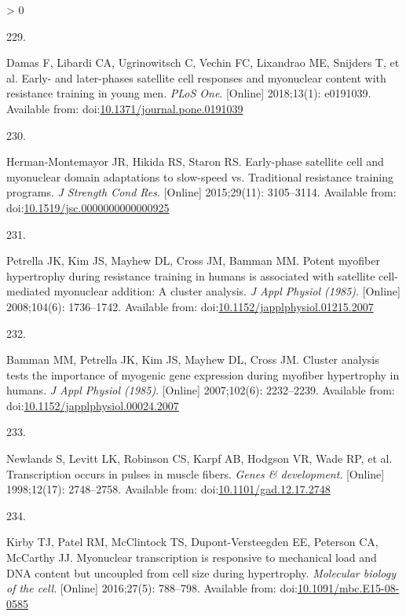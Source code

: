 \documentclass[twoside,10pt]{gihclass} %
\newlength{\cslhangindent}
\newlength{\csllabelwidth}
\newenvironment{CSLReferences}[3] %
 {%
  \setlength{\parindent}{0pt}
  \ifodd #1 \everypar{\setlength{\hangindent}{\cslhangindent}}\ignorespaces\fi
  \ifnum #2 > 0
  \setlength{\parskip}{#2\baselineskip}
  \fi
 }%
 {}
\newcommand{\CSLLeftMargin}[1]{\parbox[t]{\maxof{\widthof{#1}}{\csllabelwidth}}{#1}}
\newcommand{\CSLRightInline}[1]{\parbox[t]{\linewidth}{#1}}
\begin{document}
\begin{CSLReferences}{0}{0}
\leavevmode\hypertarget{ref-RN2112}{}%
\CSLLeftMargin{229. }
\CSLRightInline{Damas F, Libardi CA, Ugrinowitsch C, Vechin FC, Lixandrao ME, Snijders T, et al. Early- and later-phases satellite cell responses and myonuclear content with resistance training in young men. \emph{PLoS One}. {[}Online{]} 2018;13(1): e0191039. Available from: doi:\href{https://doi.org/10.1371/journal.pone.0191039}{10.1371/journal.pone.0191039}}

\leavevmode\hypertarget{ref-RN2874}{}%
\CSLLeftMargin{230. }
\CSLRightInline{Herman-Montemayor JR, Hikida RS, Staron RS. Early-phase satellite cell and myonuclear domain adaptations to slow-speed vs. Traditional resistance training programs. \emph{J Strength Cond Res}. {[}Online{]} 2015;29(11): 3105--3114. Available from: doi:\href{https://doi.org/10.1519/jsc.0000000000000925}{10.1519/jsc.0000000000000925}}

\leavevmode\hypertarget{ref-RN2868}{}%
\CSLLeftMargin{231. }
\CSLRightInline{Petrella JK, Kim JS, Mayhew DL, Cross JM, Bamman MM. Potent myofiber hypertrophy during resistance training in humans is associated with satellite cell-mediated myonuclear addition: A cluster analysis. \emph{J Appl Physiol (1985)}. {[}Online{]} 2008;104(6): 1736--1742. Available from: doi:\href{https://doi.org/10.1152/japplphysiol.01215.2007}{10.1152/japplphysiol.01215.2007}}

\leavevmode\hypertarget{ref-RN765}{}%
\CSLLeftMargin{232. }
\CSLRightInline{Bamman MM, Petrella JK, Kim JS, Mayhew DL, Cross JM. Cluster analysis tests the importance of myogenic gene expression during myofiber hypertrophy in humans. \emph{J Appl Physiol (1985)}. {[}Online{]} 2007;102(6): 2232--2239. Available from: doi:\href{https://doi.org/10.1152/japplphysiol.00024.2007}{10.1152/japplphysiol.00024.2007}}

\leavevmode\hypertarget{ref-RN2618}{}%
\CSLLeftMargin{233. }
\CSLRightInline{Newlands S, Levitt LK, Robinson CS, Karpf AB, Hodgson VR, Wade RP, et al. Transcription occurs in pulses in muscle fibers. \emph{Genes \& development}. {[}Online{]} 1998;12(17): 2748--2758. Available from: doi:\href{https://doi.org/10.1101/gad.12.17.2748}{10.1101/gad.12.17.2748}}

\leavevmode\hypertarget{ref-RN2616}{}%
\CSLLeftMargin{234. }
\CSLRightInline{Kirby TJ, Patel RM, McClintock TS, Dupont-Versteegden EE, Peterson CA, McCarthy JJ. Myonuclear transcription is responsive to mechanical load and DNA content but uncoupled from cell size during hypertrophy. \emph{Molecular biology of the cell}. {[}Online{]} 2016;27(5): 788--798. Available from: doi:\href{https://doi.org/10.1091/mbc.E15-08-0585}{10.1091/mbc.E15-08-0585}}


\end{CSLReferences}
\end{document}

